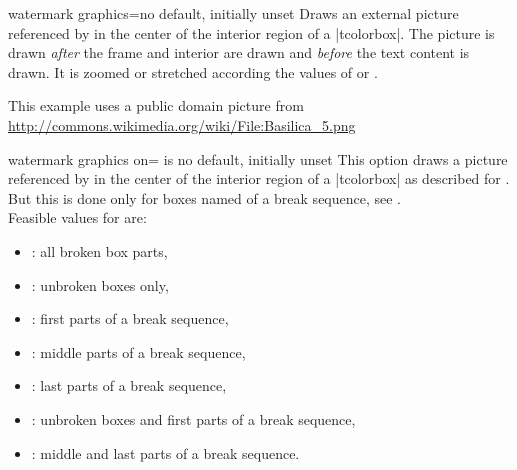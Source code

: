 \clearpage


\begin{docTcbKey}{watermark graphics}{=}{no default, initially unset}
  Draws an external picture referenced by 
  in the center of the interior region of a |tcolorbox|.
  The picture is drawn \emph{after} the
  frame and interior are drawn and \emph{before} the text content is drawn.
  It is zoomed or stretched according the values of
   or .
\begin{dispExample}

\begin{tcolorbox}[enhanced,title=My title,watermark graphics=Basilica_5.png,
  watermark opacity=0.15]
\lipsum[1-2]
\tcblower
This example uses a public domain picture from\\
\url{http://commons.wikimedia.org/wiki/File:Basilica_5.png}
\end{tcolorbox}
\end{dispExample}
\end{docTcbKey}


\begin{docTcbKey}{watermark graphics on}{= is }{no default, initially unset}
  This option draws a picture referenced by  in the center of the interior region of a |tcolorbox|
  as described for .
  But this is done only for boxes named  of a break sequence, see
  .\\ 
  Feasible values for  are:
  \begin{itemize}
  \item{}: all broken box parts,
  \item{}: unbroken boxes only,
  \item{}: first parts of a break sequence,
  \item{}: middle parts of a break sequence,
  \item{}: last parts of a break sequence,
  \item{}: unbroken boxes and first parts of a break sequence,
  \item{}: middle and last parts of a break sequence.
  \end{itemize}
\end{docTcbKey}



